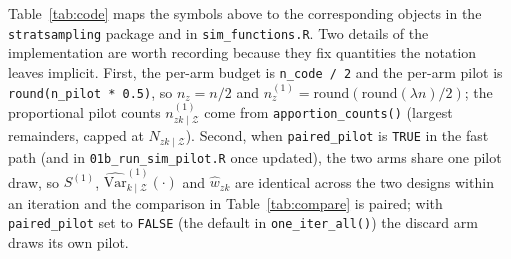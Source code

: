 \documentclass[12pt]{article}
\theoremstyle{remark}
\def\Var{\mbox{Var}}
\newcommand{\NzkZ}{N_{zk \mid\mathcal{Z}}}
\newcommand{\varkZpil}[1]{\widehat{\Var}^{(1)}_{k \mid \mathcal{Z}} \! \left ( #1 \right )}
\newcommand{\npzkZ}{n^{(1)}_{zk \mid \mathcal{Z}}}
\newcommand{\code}[1]{\texttt{#1}}
\begin{document}
Table~\ref{tab:code} maps the symbols above to the corresponding objects in the \code{stratsampling} package and in \code{sim\_functions.R}. Two details of the implementation are worth recording because they fix quantities the notation leaves implicit. First, the per-arm budget is \code{n\_code / 2} and the per-arm pilot is \code{round(n\_pilot * 0.5)}, so $n_z = n/2$ and $n^{(1)}_z = \mathrm{round}(\mathrm{round}(\lambda n)/2)$; the proportional pilot counts $\npzkZ$ come from \code{apportion\_counts()} (largest remainders, capped at $\NzkZ$). Second, when \code{paired\_pilot} is \code{TRUE} in the fast path (and in \code{01b\_run\_sim\_pilot.R} once updated), the two arms share one pilot draw, so $S^{(1)}$, $\varkZpil{\cdot}$ and $\hat{w}_{zk}$ are identical across the two designs within an iteration and the comparison in Table~\ref{tab:compare} is paired; with \code{paired\_pilot} set to \code{FALSE} (the default in \code{one\_iter\_all()}) the discard arm draws its own pilot.
\end{document}
